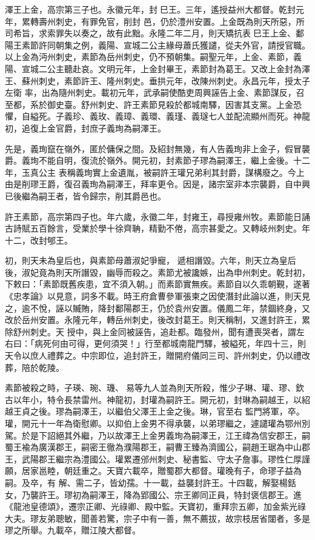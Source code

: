\begin{pinyinscope}
 澤王上金，高宗第三子也。永徽元年，封巳王。三年，遙授益州大都督。乾封元年，累轉壽州刺史，有罪免官，削封
 邑，仍於澧州安置。上金既為則天所惡，所司希旨，求索罪失以奏之，故有此黜。永隆二年二月，則天矯抗表巳王上金、鄱陽王素節許同朝集之例，義陽、宣城二公主緣母蕭氏獲譴，從夫外官，請授官職。以上金為沔州刺史，素節為岳州刺史，仍不預朝集。嗣聖元年，上金、素節，義陽、宣城二公主聽赴哀。文明元年，上金封畢王，素節封為葛王。又改上金封為澤王、蘇州刺史，素節許王、隆州刺史。垂拱元年，改陳州刺史。永昌元年，授太子左衛
 率，出為隨州刺史。載初元年，武承嗣使酷吏周興誣告上金、素節謀反，召至都，系於御史臺。舒州刺史、許王素節見殺於都城南驛，因害其支黨。上金恐懼，自縊死。子義珍、義玫、義璋、義環、義瑾、義璲七人並配流顯州而死。神龍初，追復上金官爵，封庶子義珣為嗣澤王。



 先是，義珣竄在嶺外，匿於傭保之間。及紹封無幾，有人告義珣非上金子，假冒襲爵。義珣不能自明，復流於嶺外。開元初，封素節子璆為嗣澤王，繼上金後。十二年，玉真公主
 表稱義珣實上金遺胤，被嗣許王瓘兄弟利其封爵，謀構廢之。今上由是削璆王爵，復召義珣為嗣澤王，拜率更令。因是，諸宗室非本宗襲爵，自中興已後繼為嗣王者，皆令歸宗，削其爵邑也。



 許王素節，高宗第四子也。年六歲，永徽二年，封雍王，尋授雍州牧。素節能日誦古詩賦五百餘言，受業於學十徐齊聃，精勤不倦，高宗甚愛之。又轉岐州刺史。年十二，改封郇王。



 初，則天未為皇后也，與素節母蕭淑妃爭寵，
 遞相譖毀。六年，則天立為皇后後，淑妃竟為則天所譖毀，幽辱而殺之。素節尤被讒嫉，出為申州刺史。乾封初，下敕曰：「素節既舊疾患，宜不須入朝。」而素節實無疾。素節自以久乖朝覲，遂著《忠孝論》以見意，詞多不載。時王府倉曹參軍張柬之因使潛封此論以進，則天見之，逾不悅，誣以贓賄，降封鄱陽郡王，仍於袁州安置。儀鳳二年，禁錮終身，又改於岳州安置。永隆元年，轉岳州刺史，後改封葛王。則天稱制，又進封許王，累除舒州刺史。天
 授中，與上金同被誣告，追赴都。臨發州，聞有遭喪哭者，謂左右曰：「病死何由可得，更何須哭！」行至都城南龍門驛，被縊死，年四十三，則天令以庶人禮葬之。中宗即位，追封許王，贈開府儀同三司、許州刺史，仍以禮改葬，陪於乾陵。



 素節被殺之時，子瑛、琬、璣、易等九人並為則天所殺，惟少子琳、瓘、璆、欽古以年小，特令長禁雷州。神龍初，封瓘為嗣許王。開元初，封琳為嗣越王，以紹越王貞之後。璆為嗣澤王，以繼伯父澤王上金之後。琳，官至右
 監門將軍，卒。瓘，開元十一年為衛慰卿。以抑伯上金男不得承襲，以弟璆繼之，遽譴瓘為鄂州別駕。於是下詔絕其外繼，乃以故澤王上金男義珣為嗣澤王，江王禕為信安郡王，嗣蜀王褕為廣漢郡王，嗣密王徹為濮陽郡王，嗣曹王臻為濟國公，嗣趙王琚為中山郡王，武陽郡王繼宗為澧國公。瓘累遷邠州刺史、秘書監、守太子詹事。璆性仁厚謹願，居家邕睦，朝廷重之。天寶六載卒，贈蜀郡大都督。瓘晚有子，命璆子益為嗣。及卒，有
 解、需二子，皆幼孺。十一載，益襲封許王。十四載，解娶楊銛女，乃襲許王。璆初為嗣澤王，降為郢國公、宗王卿同正員，特封褒信郡王。進《龍池皇德頌》，遷宗正卿、光祿卿、殿中監。天寶初，重拜宗五卿，加金紫光祿大夫。璆友弟聰敏，聞善若驚，宗子中有一善，無不薦拔，故宗枝居省闥者，多是璆之所舉。九載卒，贈江陵大都督。




\end{pinyinscope}
